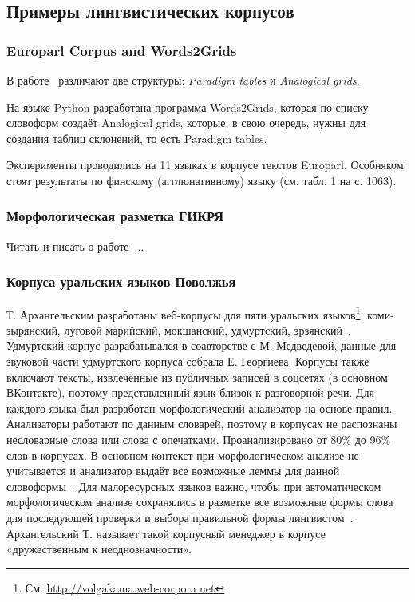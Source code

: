  \subsection{Примеры лингвистических корпусов}

 \subsubsection{Europarl Corpus and Words2Grids}

В работе~\cite{Fam2018tools} различают две структуры: \emph{Paradigm tables} 
и \emph{Analogical grids}. 

На языке Python разработана программа Words2Grids, которая по списку словоформ 
создаёт Analogical grids, которые, в свою очередь, нужны для создания 
таблиц склонений, то есть Paradigm tables.

Эксперименты проводились на 11 языках в корпусе текстов Europarl. 
Особняком стоят результаты по финскому (агглюнативному) языку (см. табл. 1 на с. 1063).


\subsubsection{Морфологическая разметка ГИКРЯ}

Читать и писать о работе~\cite{Selegey2016}...

\subsubsection{Корпуса уральских языков Поволжья}
Т. Архангельским разработаны веб-корпусы для пяти уральских языков\footnote{См. \url{http://volgakama.web-corpora.net}}: коми-зырянский, луговой марийский, мокшанский, удмуртский, эрзянский~\cite{Arkhangelskiy2020}. Удмуртский корпус разрабатывался в соавторстве с М. Медведевой, данные для звуковой части удмуртского корпуса собрала Е. Георгиева. Корпусы также включают тексты, извлечённые из публичных записей в соцсетях (в основном ВКонтакте), поэтому представленный язык близок к разговорной речи. Для каждого языка был разработан морфологический анализатор на основе правил. Анализаторы работают по данным словарей, поэтому в корпусах не распознаны несловарные слова или слова с опечатками. Проанализировано от 80\% до 96\% слов в корпусах. В основном контекст при морфологическом анализе не учитывается и анализатор выдаёт все возможные леммы для данной словоформы~\cite[58--59]{Arkhangelskiy2020}. Для малоресурсных языков важно, чтобы при автоматическом морфологическом анализе сохранялись в разметке все возможные формы слова для последующей проверки и выбора правильной формы лингвистом~\cite[61]{Arkhangelskiy2020}. Архангельский Т. называет такой корпусный менеджер в корпусе «дружественным к неоднозначности».

